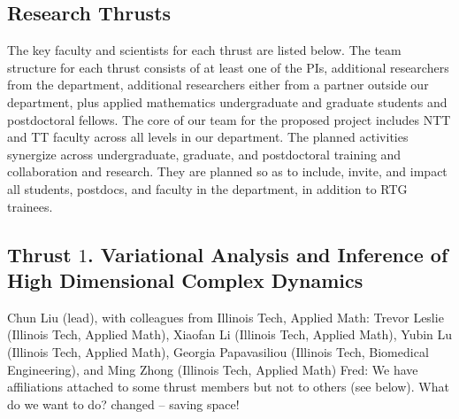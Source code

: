 \documentclass[11pt]{NSFamsart}
\newcommand{\FredNote}[1]{{\color{blue} Fred: #1}}
\begin{document}
\subsection{Research Thrusts} \label{sec:researchproblems}



The key faculty and scientists for each thrust are listed below. 
The team structure for each thrust consists of at least one of the PIs,  additional researchers from the department, additional researchers either from a partner outside our department, %
plus applied mathematics undergraduate and graduate students and postdoctoral fellows.
The core of our team for the proposed project includes NTT and TT faculty across all levels in our department. The planned activities synergize across undergraduate, graduate, and postdoctoral training and collaboration and research. They are planned so as to include, invite, and impact all students, postdocs, and faculty in the department, in addition to RTG trainees.




\subsection*{Thrust $1$. Variational Analysis and Inference of High Dimensional Complex Dynamics}
Chun Liu (lead), 
with colleagues from Illinois Tech, Applied Math: Trevor Leslie (Illinois Tech, Applied Math), Xiaofan Li (Illinois Tech, Applied Math), Yubin Lu (Illinois Tech, Applied Math), Georgia Papavasiliou (Illinois Tech, Biomedical Engineering), and Ming Zhong (Illinois Tech, Applied Math)
\FredNote{We have affiliations attached to some thrust members but not to others (see below).  What do we want to do?}{\color{magenta} changed -- saving space!}
\end{document}
